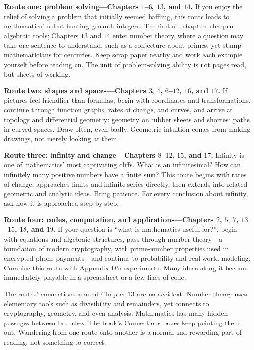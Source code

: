 \textbf{Route one: problem solving---Chapters $1$--$6$, $13$, and $14$.} If you enjoy the relief of solving a problem that initially seemed baffling, this route leads to mathematics' oldest hunting ground: integers. The first six chapters sharpen algebraic tools; Chapters $13$ and $14$ enter number theory, where a question may take one sentence to understand, such as a conjecture about primes, yet stump mathematicians for centuries. Keep scrap paper nearby and work each example yourself before reading on. The unit of problem-solving ability is not pages read, but sheets of working.

\textbf{Route two: shapes and spaces---Chapters $3$, $4$, $6$--$12$, $16$, and $17$.} If pictures feel friendlier than formulas, begin with coordinates and transformations, continue through function graphs, rates of change, and curves, and arrive at topology and differential geometry: geometry on rubber sheets and shortest paths in curved spaces. Draw often, even badly. Geometric intuition comes from making drawings, not merely looking at them.

\textbf{Route three: infinity and change---Chapters $8$--$12$, $15$, and $17$.} Infinity is one of mathematics' most captivating cliffs. What is an infinitesimal? How can infinitely many positive numbers have a finite sum? This route begins with rates of change, approaches limits and infinite series directly, then extends into related geometric and analytic ideas. Bring patience. For every conclusion about infinity, ask how it is approached step by step.

\textbf{Route four: codes, computation, and applications---Chapters $2$, $5$, $7$, $13$--$15$, $18$, and $19$.} If your question is ``what is mathematics useful for?'', begin with equations and algebraic structures, pass through number theory---a foundation of modern cryptography, with prime-number properties used in encrypted phone payments---and continue to probability and real-world modeling. Combine this route with Appendix D's experiments. Many ideas along it become immediately playable in a spreadsheet or a few lines of code.

\begin{lianjie}
The routes' connections around Chapter $13$ are no accident. Number theory uses elementary tools such as divisibility and remainders, yet connects to cryptography, geometry, and even analysis. Mathematics has many hidden passages between branches. The book's Connections boxes keep pointing them out. Wandering from one route onto another is a normal and rewarding part of reading, not something to correct.
\end{lianjie}

